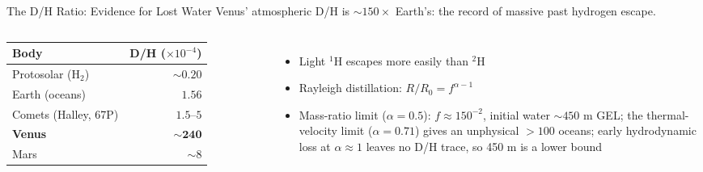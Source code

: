 \documentclass[aspectratio=169, 11pt]{beamer}
\begin{document}
\begin{frame}{The D/H Ratio: Evidence for Lost Water}
  Venus' atmospheric D/H is $\sim 150\times$ Earth's: the record of massive past hydrogen escape.
  \vskip6pt
  \begin{columns}[c]
    \centering
    \small
    \begin{tabular}{l r}
      \toprule
      \textbf{Body} & \textbf{D/H ($\times 10^{-4}$)} \\
      \midrule
      Protosolar (H$_2$) & $\sim 0.20$ \\
      Earth (oceans) & $1.56$ \\
      Comets (Halley, 67P) & $1.5$--$5$ \\
      \textbf{Venus} & $\sim \mathbf{240}$ \\
      Mars & $\sim 8$ \\
      \bottomrule
    \end{tabular}
    \vskip4pt

    \begin{itemize}
      \item Light $^1\mathrm{H}$ escapes more easily than $^2\mathrm{H}$
      \item Rayleigh distillation: $R/R_0 = f^{\alpha-1}$
      \item Mass-ratio limit ($\alpha = 0.5$): $f \approx 150^{-2}$, initial water $\sim 450$ m GEL; the thermal-velocity limit ($\alpha = 0.71$) gives an unphysical $> 100$ oceans; early hydrodynamic loss at $\alpha \approx 1$ leaves no D/H trace, so 450 m is a lower bound
    \end{itemize}
  \end{columns}
\end{frame}

\begin{frame}
\end{frame}
\end{document}
